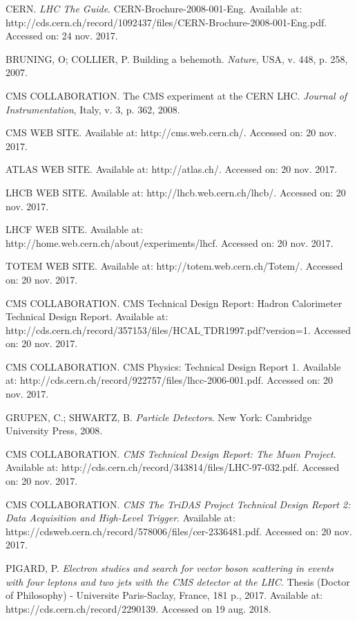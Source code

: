 \begin{thebibliography}{}
CERN. \textit{LHC The Guide}. CERN-Brochure-2008-001-Eng. Available at: http://cds.cern.ch/record/1092437/files/CERN-Brochure-2008-001-Eng.pdf. Accessed on: 24 nov. 2017.

BRUNING, O; COLLIER, P. Building a behemoth. \textit{Nature}, USA, v. 448, p. 258, 2007.

CMS COLLABORATION. The CMS experiment at the CERN LHC. \textit{Journal of Instrumentation}, Italy, v. 3, p. 362, 2008.

CMS WEB SITE. Available at: http://cms.web.cern.ch/. Accessed on: 20 nov. 2017.

ATLAS WEB SITE. Available at: http://atlas.ch/. Accessed on: 20 nov. 2017.

LHCB WEB SITE. Available at: http://lhcb.web.cern.ch/lhcb/. Accessed on: 20 nov. 2017.

LHCF WEB SITE. Available at: http://home.web.cern.ch/about/experiments/lhcf. Accessed on: 20 nov. 2017.

TOTEM WEB SITE. Available at: http://totem.web.cern.ch/Totem/. Accessed on: 20 nov. 2017.

CMS COLLABORATION. CMS Technical Design Report: Hadron Calorimeter Technical Design Report. Available at: http://cds.cern.ch/record/357153/files/HCAL$\_$TDR1997.pdf?version=1. Accessed on: 20 nov. 2017.

CMS COLLABORATION. CMS Physics: Technical Design Report 1. Available at: http://cds.cern.ch/record/922757/files/lhcc-2006-001.pdf. Accessed on: 20 nov. 2017.

GRUPEN, C.; SHWARTZ, B. \textit{Particle Detectors}. New York: Cambridge University Press, 2008.

CMS COLLABORATION. \textit{CMS Technical Design Report: The Muon Project}. Available at: http://cds.cern.ch/record/343814/files/LHC-97-032.pdf. Accessed on: 20 nov. 2017. 

CMS COLLABORATION. \textit{CMS The TriDAS Project Technical Design Report 2: Data Acquisition and High-Level Trigger}. Available at: https://cdsweb.cern.ch/record/578006/files/cer-2336481.pdf. Accessed on: 20 nov. 2017.

PIGARD, P. \textit{Electron studies and search for vector boson scattering in events with four leptons and two jets with the CMS detector at the LHC}. Thesis (Doctor of Philosophy) - Universite Paris-Saclay, France, 181 p., 2017. Available at: https://cds.cern.ch/record/2290139. Accessed on 19 aug. 2018.



\end{thebibliography}
